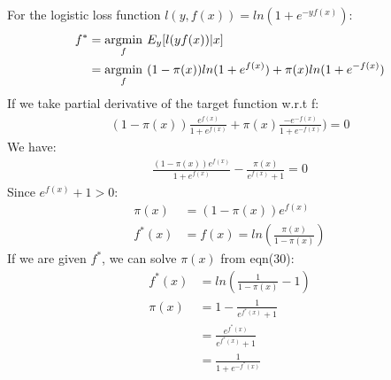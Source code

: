 \documentclass{article}
\newenvironment{problem}[2][$\bullet$]{\begin{trivlist}\large
		\item[\hskip \labelsep {\bfseries #1}\hskip \labelsep {\bfseries #2.}]}  {\end{trivlist}}
\begin{document}
\begin{problem}{5.3}
\end{problem}
For the logistic loss function $l(y,f(x)) = ln(1+e^{-yf(x)})$:
\begin{align}
f^* &= \underset{f}{\operatorname{arg min}} \hspace{0.05in} E_y[l(yf(x))|x]\\
&= \underset{f}{\operatorname{arg min}} \hspace{0.05in} (1- \pi(x))ln(1+e^{f(x)}) + \pi(x)ln(1+e^{-f(x)})
\end{align}
If we take partial derivative of the target function w.r.t f:
\begin{align}
(1-\pi(x))\frac{e^{f(x)}}{1+e^{f(x)}}+\pi(x)\frac{-e^{-f(x)}}{1+e^{-f(x)}})=0
\end{align}
We have:
\begin{align}
\frac{(1-\pi(x)) e^{f(x)}}{1+e^{f(x)}}- \frac{\pi(x)}{e^{f(x)}+1} = 0
\end{align}
Since $e^{f(x)}+1 > 0$:
\begin{align}
 \pi(x) &= (1-\pi(x)) e^{f(x)} \\
f^*(x)&= f(x) = ln(\frac{\pi(x)}{1-\pi(x)})
\end{align}
If we are given $f^*$, we can solve $\pi(x)$ from eqn(30):
\begin{align}
f^*(x) &= ln(\frac{1}{1-\pi(x)}-1)\\
\pi(x) &= 1-\frac{1}{e^{f^*(x)}+1}\\
&= \frac{e^{f^*(x)}}{e^{f^*(x)}+1}\\
&= \frac{1}{1+e^{-f^*(x)}}
\end{align}
\end{document}
